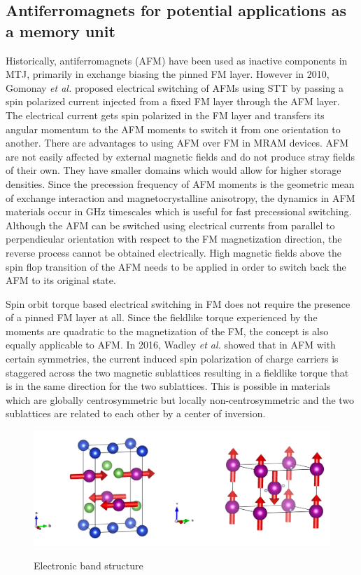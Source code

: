 \documentclass[11pt,edeposit,draftthesis]{uiucthesis2020}
\begin{document}
\begin{mainmatter}
\section{Antiferromagnets for potential applications as a memory unit}

Historically, antiferromagnets (AFM) have been used as inactive components in MTJ, primarily in exchange biasing the pinned FM layer. However in 2010, Gomonay \emph{et al.} proposed electrical switching of AFMs using STT by passing a spin polarized current injected from a fixed FM layer through the AFM layer. The electrical current gets spin polarized in the FM layer and transfers its angular momentum to the AFM moments to switch it from one orientation to another. There are advantages to using AFM over FM in MRAM devices. AFM are not easily affected by external magnetic fields and do not produce stray fields of their own. They have smaller domains which would allow for higher storage densities. Since the precession frequency of AFM moments is the geometric mean of exchange interaction and magnetocrystalline anisotropy, the dynamics in AFM materials occur in GHz timescales which is useful for fast precessional switching. Although the AFM can be switched using electrical currents from parallel to perpendicular orientation with respect to the FM magnetization direction, the reverse process cannot be obtained electrically. High magnetic fields above the spin flop transition of the AFM needs to be applied in order to switch back the AFM to its original state.

Spin orbit torque based electrical switching in FM does not require the presence of a pinned FM layer at all. Since the fieldlike torque experienced by the moments are quadratic to the magnetization of the FM, the concept is also equally applicable to AFM. In 2016, Wadley \emph{et al.} showed that in AFM with certain symmetries, the current induced spin polarization of charge carriers is staggered across the two magnetic sublattices resulting in a fieldlike torque that is in the same direction for the two sublattices. This is possible in materials which are globally centrosymmetric but locally non-centrosymmetric and the two sublattices are related to each other by a center of inversion.


\begin{figure}
\centering\includegraphics[width=\columnwidth]{figures/ch1/CuMnAs-MnF2.png} \\
\caption{\label{fig:tet-CuMnAs}
Electronic band structure
}
\end{figure}


\end{mainmatter}
\end{document}
